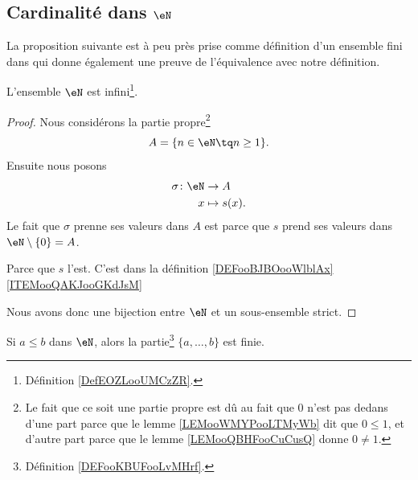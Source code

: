 \subsection{Cardinalité dans \( \eN\)}

\begin{normaltext}	\label{NORMooEnsembleFiniEquivalenceDef}
	La proposition suivante est à peu près prise comme définition d'un ensemble fini dans \cite{ooVAYLooJxVYex} qui donne également une preuve de l'équivalence avec notre définition.
\end{normaltext}

\begin{proposition}     \label{PROPooBYKCooGDkfWy}
	L'ensemble \( \eN\) est infini\footnote{Définition \ref{DefEOZLooUMCzZR}.}.
\end{proposition}

\begin{proof}
	Nous considérons la partie propre\footnote{Le fait que ce soit une partie propre est dû au fait que \( 0\) n'est pas dedans d'une part parce que le lemme \ref{LEMooWMYPooLTMyWb} dit que \( 0\leq 1\), et d'autre part parce que le lemme \ref{LEMooQBHFooCuCusQ} donne \( 0\neq 1\).}
	\begin{equation}
		A=\{ n\in \eN\tq n\geq 1 \}.
	\end{equation}
	Ensuite nous posons
	\begin{equation}
		\begin{aligned}
			\sigma\colon \eN & \to A         \\
			x                & \mapsto s(x).
		\end{aligned}
	\end{equation}
	Le fait que \( \sigma\) prenne ses valeurs dans \( A\) est parce que \( s\) prend ses valeurs dans \( \eN\setminus\{ 0 \}=A\).
	\begin{subproof}
		Parce que \( s\) l'est.
		C'est dans la définition \ref{DEFooBJBOooWlblAx}\ref{ITEMooQAKJooGKdJsM}
	\end{subproof}
	Nous avons donc une bijection entre \( \eN\) et un sous-ensemble strict.
\end{proof}

\begin{lemma}       \label{LEMooYIWDooIQFSad}
	Si \( a\leq b\) dans \( \eN\), alors la partie\footnote{Définition \ref{DEFooKBUFooLvMHrf}.} \( \{ a,\ldots, b \}\) est finie.
\end{lemma}

